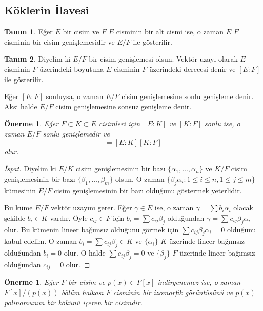 \documentclass[draft]{article}
\newtheorem{prop}[thm]{Önerme}
\theoremstyle{definition}
\newtheorem{defn}{Tanım}[section]
\theoremstyle{remark}
\begin{document}
		\subsection{Köklerin İlavesi}
		
			\begin{defn}
			    Eğer $E$ bir cisim ve $F$ $E$ cisminin bir alt cismi ise, o zaman $E$ $F$ cisminin bir cisim genişlemesidir ve $E/F$ ile gösterilir.
			\end{defn}
			
			\begin{defn}
			    Diyelim ki $E/F$ bir cisim genişlemesi olsun. Vektör uzayı olarak $E$ cisminin $F$ üzerindeki boyutuna $E$ cisminin $F$ üzerindeki derecesi denir ve $[E:F]$ ile gösterilir.\par
			    Eğer $[E : F]$ sonluysa, o zaman $E/F$ cisim genişlemesine sonlu genişleme denir. Aksi halde $E/F$ cisim genişlemesine sonsuz genişleme denir.
			\end{defn}
			
			\begin{prop}
				Eğer $F \subset K \subset E$ cisimleri için $[E : K]$ ve $[K : F]$ sonlu ise, o zaman $E/F$ sonlu genişlemedir ve
				\begin{equation*}
					[E : F] = [E : K][K : F]
				\end{equation*}
				olur.
			\end{prop}
			
			\begin{proof}[İspat]
			    Diyelim ki $E/K$ cisim genişlemesinin bir bazı $\{\alpha_1, \dots, \alpha_n\}$ ve $K/F$ cisim genişlemesinin bir bazı $\{\beta_1, \dots, \beta_m\}$ olsun. O zaman $\{\beta_j\alpha_i : 1 \leq i \leq n, 1 \leq j \leq m\}$ kümesinin $E/F$ cisim genişlemesinin bir bazı olduğunu göstermek yeterlidir.\par
			    Bu küme $E/F$ vektör uzayını gerer. Eğer $\gamma \in E$ ise, o zaman $\gamma = \sum{b_i\alpha_i}$ olacak şekilde $b_i \in K$ vardır. Öyle $c_{ij} \in F$ için $b_i = \sum{c_{ij}\beta_j}$ olduğundan $\gamma = \sum{c_{ij}\beta_j\alpha_i}$ olur. Bu kümenin lineer bağımsız olduğunu görmek için $\sum{c_{ij}\beta_j\alpha_i} = 0$ olduğunu kabul edelim. O zaman $b_i = \sum{c_{ij}\beta_j} \in K$ ve $\{\alpha_i\}$ $K$ üzerinde lineer bağımsız olduğundan $b_i = 0$ olur. O halde $\sum{c_{ij}\beta_j} = 0$ ve $\{\beta_j\}$ $F$ üzerinde lineer bağımsız olduğundan $c_{ij} = 0$ olur.
			\end{proof}
			
			\begin{prop}
			    Eğer $F$ bir cisim ve $p(x) \in F[x]$ indirgenemez ise, o zaman $F[x]/(p(x))$ bölüm halkası $F$ cisminin bir izomorfik görüntüsünü ve $p(x)$ polinomunun bir kökünü içeren bir cisimdir.
			\end{prop}
			
\end{document}

